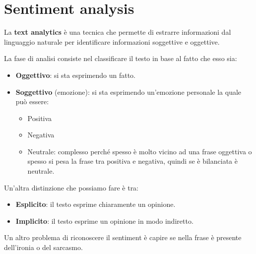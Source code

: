 \section{Sentiment analysis}
\begin{definizione}
      La \textbf{text analytics} è una tecnica che permette di estrarre informazioni
      dal linguaggio naturale per identificare informazioni soggettive e oggettive.
\end{definizione}
La fase di analisi consiste nel classificare il testo in base al fatto che esso
sia:
\begin{itemize}
      \item \textbf{Oggettivo}: si sta esprimendo un fatto.
      \item \textbf{Soggettivo} (emozione): si sta esprimendo un'emozione personale la quale
            può essere:
            \begin{itemize}
                  \item Positiva
                  \item Negativa
                  \item Neutrale: complesso perché spesso è molto vicino ad una
                        frase oggettiva o spesso si pesa la frase tra positiva e
                        negativa, quindi se è bilanciata è neutrale.
            \end{itemize}
\end{itemize}
Un'altra distinzione che possiamo fare è tra:
\begin{itemize}
      \item \textbf{Esplicito}: il testo esprime chiaramente un opinione.
      \item \textbf{Implicito}: il testo esprime un opinione in modo indiretto.
\end{itemize}
Un altro problema di riconoscere il sentiment è capire se nella frase è
presente dell'ironia o del sarcasmo.
